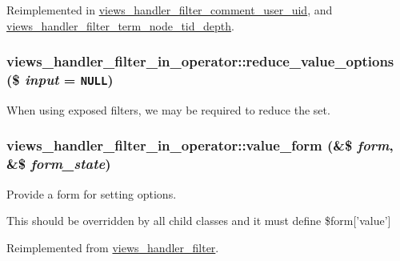Reimplemented in \hyperlink{classviews__handler__filter__comment__user__uid_5b649bd04038ac8ed577410ad54ad5b0}{views\_\-handler\_\-filter\_\-comment\_\-user\_\-uid}, and \hyperlink{classviews__handler__filter__term__node__tid__depth_ff1d2c0057597790a56bffd0674f391a}{views\_\-handler\_\-filter\_\-term\_\-node\_\-tid\_\-depth}.\hypertarget{classviews__handler__filter__in__operator_852f413796906e05a5dca6e839e8e470}{
\subsubsection[{reduce\_\-value\_\-options}]{\setlength{\rightskip}{0pt plus 5cm}views\_\-handler\_\-filter\_\-in\_\-operator::reduce\_\-value\_\-options (\$ {\em input} = {\tt NULL})}}
\label{classviews__handler__filter__in__operator_852f413796906e05a5dca6e839e8e470}


When using exposed filters, we may be required to reduce the set. \hypertarget{classviews__handler__filter__in__operator_6736083657cad0f8c7299b000f2b8e60}{
\subsubsection[{value\_\-form}]{\setlength{\rightskip}{0pt plus 5cm}views\_\-handler\_\-filter\_\-in\_\-operator::value\_\-form (\&\$ {\em form}, \/  \&\$ {\em form\_\-state})}}
\label{classviews__handler__filter__in__operator_6736083657cad0f8c7299b000f2b8e60}


Provide a form for setting options.

This should be overridden by all child classes and it must define \$form\mbox{[}'value'\mbox{]} 

Reimplemented from \hyperlink{classviews__handler__filter_9168b39edae84b20e01a3fd0d810ba66}{views\_\-handler\_\-filter}.

